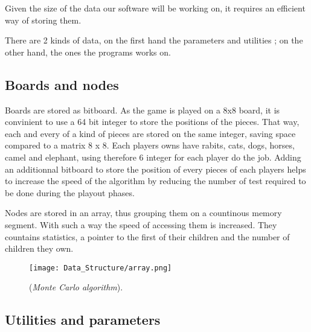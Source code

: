 Given the size of the data our software will be working on, it requires an efficient way of storing them.

There are 2 kinds of data, on the first hand the parameters and utilities ; on the other hand, the ones the programs works on.
\subsection{Boards and nodes}
Boards are stored as bitboard. As the game is played on a 8x8 board, it is convinient to use a 64 bit integer to store the positions of the pieces.
That way, each and every of a kind of pieces are stored on the same integer, saving space compared to a matrix 8 x 8.
Each players owns have rabits, cats, dogs, horses, camel and elephant, using therefore 6 integer for each player do the job. Adding an additionnal bitboard to store the position of every pieces of each players helps to increase the speed of the algorithm by reducing the number of test required to be done during the playout phases.

Nodes are stored in an array, thus grouping them on a countinous memory segment. With such a way the speed of accessing them is increased.
They countains statistics, a pointer to the first of their children and the number of children they own.

\begin{figure}[!h] 
\centerline{\texttt{[image: Data\_Structure/array.png]}}
\caption{\label{fig:array}(\textit{Monte Carlo algorithm}).}
\end{figure}


\subsection{Utilities and parameters}
